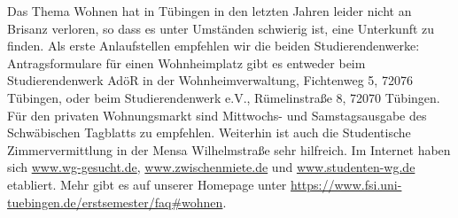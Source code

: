 Das Thema Wohnen hat in Tübingen in den letzten Jahren leider nicht an Brisanz verloren, so dass
es unter Umständen schwierig ist, eine Unterkunft zu finden. Als erste Anlaufstellen empfehlen wir
die beiden Studierendenwerke: Antragsformulare für einen Wohnheimplatz gibt es entweder beim
Studierendenwerk AdöR in der Wohnheimverwaltung, Fichtenweg 5, 72076 Tübingen, oder beim Studierendenwerk
e.V., Rümelinstraße 8, 72070 Tübingen. Für den privaten Wohnungsmarkt sind Mittwochs- und Samstagsausgabe
des Schwäbischen Tagblatts zu empfehlen. Weiterhin ist auch die Studentische Zimmervermittlung in der Mensa
Wilhelmstraße sehr hilfreich. Im Internet haben sich \url{www.wg-gesucht.de}, \url{www.zwischenmiete.de} und
\url{www.studenten-wg.de} etabliert. Mehr gibt es auf
unserer Homepage unter \url{https://www.fsi.uni-tuebingen.de/erstsemester/faq\#wohnen}.
\fi
